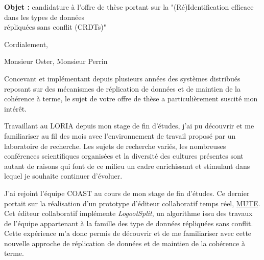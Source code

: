 \documentclass[11pt,a4paper,sans]{moderncv}        %
\newcommand{\customboldlink}[1]{\color{href} #1}
\newcommand{\tab}{\quad \quad}
\begin{document}
\justify
\date{À Nancy, le 25 mai 2017}
\opening{
  \textbf{Objet :} candidature à l'offre de thèse portant sur la "(Ré)Identification efficace dans les types de données\\
  \hspace{13mm}    répliquées sans conflit (CRDTs)"
}
\closing{Cordialement,}
\makelettertitle

Monsieur Oster, Monsieur Perrin


\tab Concevant et implémentant depuis plusieurs années des systèmes distribués
reposant sur des mécanismes de réplication de données et de maintien de la cohérence à terme,
le sujet de votre offre de thèse a particulièrement suscité mon intérêt.

%
%
\tab Travaillant au LORIA depuis mon stage de fin d'études,
j'ai pu découvrir et me familiariser au fil des mois avec l'environnement de travail proposé par un laboratoire de recherche.
Les sujets de recherche variés, les nombreuses conférences scientifiques organisées
et la diversité des cultures présentes sont autant de raisons
qui font de ce milieu un cadre enrichissant et stimulant dans lequel je souhaite continuer d'évoluer.

%
%
\tab J'ai rejoint l'équipe COAST au cours de mon stage de fin d'études.
Ce dernier portait sur la réalisation d'un prototype d'éditeur collaboratif temps réel,
\href{https://www.coedit.re}{\customboldlink MUTE}.
Cet éditeur collaboratif implémente \emph{LogootSplit},
un algorithme issu des travaux de l'équipe appartenant à la famille des type de données répliquées sans conflit.
Cette expérience m'a donc permis de découvrir
et de me familiariser avec cette nouvelle approche
de réplication de données et de maintien de la cohérence à terme.
\end{document}
